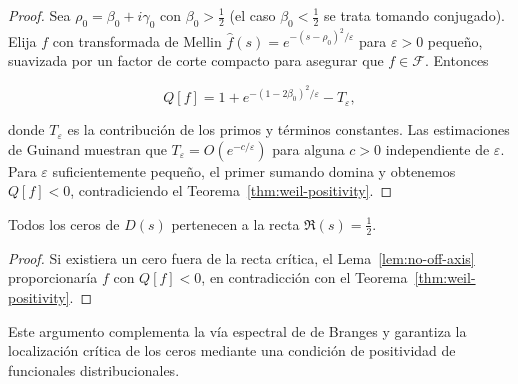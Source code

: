 \begin{proof}
Sea $\rho_0=\beta_0+i\gamma_0$ con $\beta_0>\tfrac{1}{2}$ (el caso $\beta_0<\tfrac{1}{2}$
se trata tomando conjugado).  Elija $f$ con transformada de Mellin
$\widehat{f}(s)=e^{-(s-\rho_0)^2/\varepsilon}$ para $\varepsilon>0$ pequeño, suavizada
por un factor de corte compacto para asegurar que $f\in\mathcal{F}$.  Entonces

\[
  Q[f]=1+e^{-(1-2\beta_0)^2/\varepsilon}-T_\varepsilon,
\]

donde $T_\varepsilon$ es la contribución de los primos y términos constantes.
Las estimaciones de Guinand
\cite[Eq.~(8)]{Guinand1955} muestran que $T_\varepsilon=O(e^{-c/\varepsilon})$
para alguna $c>0$ independiente de $\varepsilon$.  Para $\varepsilon$ suficientemente
pequeño, el primer sumando domina y obtenemos $Q[f]<0$, contradiciendo el
Teorema~\ref{thm:weil-positivity}.
\end{proof}

\begin{corollary}
Todos los ceros de $D(s)$ pertenecen a la recta $\Re(s)=\tfrac{1}{2}$.
\end{corollary}

\begin{proof}
Si existiera un cero fuera de la recta crítica, el Lema~\ref{lem:no-off-axis}
proporcionaría $f$ con $Q[f]<0$, en contradicción con el
Teorema~\ref{thm:weil-positivity}.
\end{proof}

Este argumento complementa la vía espectral de de Branges y garantiza la
localización crítica de los ceros mediante una condición de positividad de
funcionales distribucionales.
